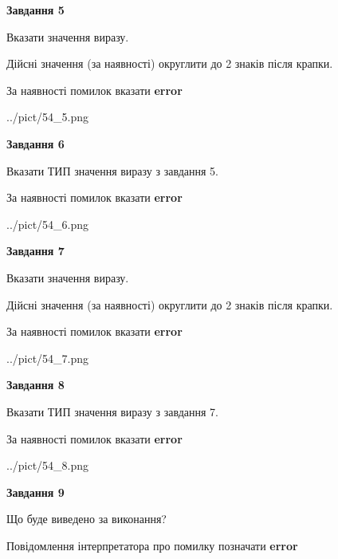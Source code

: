 \documentclass[11pt, ukrainian]{article}
\begin{document}
{\begin {large}
{\begin {center}\textbf{Завдання 5}\end {center}}\par
Вказати значення виразу. \par
Дійсні значення (за наявності) округлити до 2 знаків після крапки. \par
За наявності помилок вказати \textbf{error}

\begin{center}
	{../pict/54_5.png}
\end{center}
\newpage

{\begin {center}\textbf{Завдання 6}\end {center}}\par
Вказати ТИП значення виразу з завдання 5. \par
За наявності помилок вказати \textbf{error}

\begin{center}
	{../pict/54_6.png}
\end{center}
\newpage

{\begin {center}\textbf{Завдання 7}\end {center}}\par
Вказати значення виразу. \par
Дійсні значення (за наявності) округлити до 2 знаків після крапки. \par
За наявності помилок вказати \textbf{error}

\begin{center}
	{../pict/54_7.png}
\end{center}
\newpage

{\begin {center}\textbf{Завдання 8}\end {center}}\par
Вказати ТИП значення виразу з завдання 7. \par
За наявності помилок вказати \textbf{error}

\begin{center}
	{../pict/54_8.png}
\end{center}
\newpage

{\begin {center}\textbf{Завдання 9}\end {center}}\par
Що буде виведено за виконання? \par
Повідомлення інтерпретатора про помилку позначати \textbf{error}


\end{large}}
\end{document}
